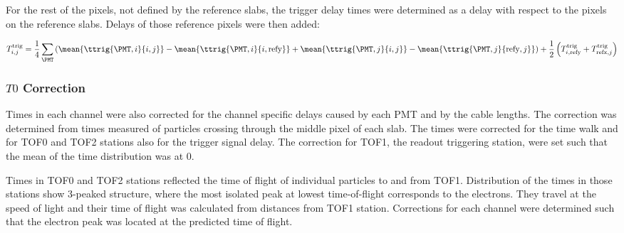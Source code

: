For the rest of the pixels, not defined by the reference slabs, the
trigger delay times were determined as a delay with respect to the
pixels on the reference slabs. Delays of those reference pixels were
then added:
%
\newcommand{\Ttrig}[1]{\ensuremath{T^\text{trig}_{#1}}}
%
\begin{linenomath}
  \begin{equation}
    \Ttrig{i,j} =
    \frac14\sum_{\PMT}
    \left(
      \mean{\ttrig{\PMT,i}{i,j}} - \mean{\ttrig{\PMT,i}{i,\text{refy}}} +
      \mean{\ttrig{\PMT,j}{i,j}} - \mean{\ttrig{\PMT,j}{\text{refy},j}}
    \right)
    + \frac12
    \left(
      \Ttrig{i,\text{refy}} + \Ttrig{\text{refx},j}
    \right)
    \label{eq:trigdel:both}
  \end{equation}
\end{linenomath}



\subsubsection{$T0$ Correction}

Times in each channel were also corrected for the channel specific
delays caused by each PMT and by the cable lengths. The correction was
determined from times measured of particles crossing through the
middle pixel of each slab. The times were corrected for the time walk
and for TOF0 and TOF2 stations also for the trigger signal delay. The
correction for TOF1, the readout triggering station, were set such
that the mean of the time distribution was at 0.

Times in TOF0 and TOF2 stations reflected the time of flight of
individual particles to and from TOF1. Distribution of the times in
those stations show 3-peaked structure, where the most isolated peak at
lowest time-of-flight corresponds to the electrons. They travel at the
speed of light and their time of flight was calculated from
distances from TOF1 station. Corrections for each channel were
determined such that the electron peak was located at the predicted
time of flight.

